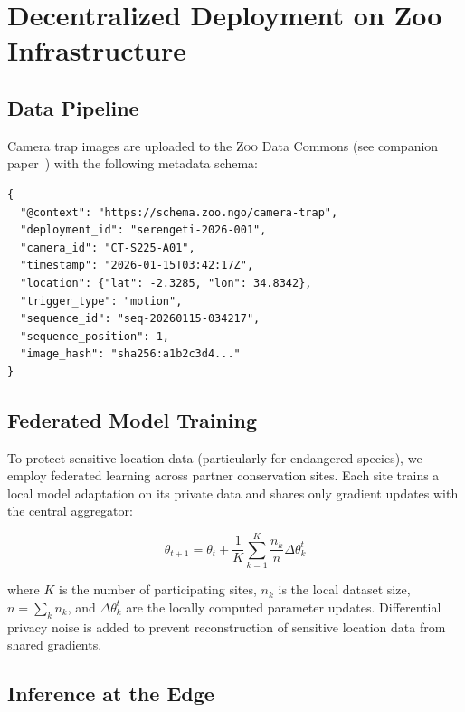 \documentclass[11pt,letterpaper]{article}
\newcommand{\Zoo}{\textsc{Zoo}}
\begin{document}
\section{Decentralized Deployment on Zoo Infrastructure}

\subsection{Data Pipeline}

Camera trap images are uploaded to the \Zoo{} Data Commons (see companion paper~\cite{zoo2026commons}) with the following metadata schema:

\begin{lstlisting}[basicstyle=\footnotesize\ttfamily, frame=single, caption={Camera trap metadata schema (JSON-LD).}]
{
  "@context": "https://schema.zoo.ngo/camera-trap",
  "deployment_id": "serengeti-2026-001",
  "camera_id": "CT-S225-A01",
  "timestamp": "2026-01-15T03:42:17Z",
  "location": {"lat": -2.3285, "lon": 34.8342},
  "trigger_type": "motion",
  "sequence_id": "seq-20260115-034217",
  "sequence_position": 1,
  "image_hash": "sha256:a1b2c3d4..."
}
\end{lstlisting}

\subsection{Federated Model Training}

To protect sensitive location data (particularly for endangered species), we employ federated learning across partner conservation sites. Each site trains a local model adaptation on its private data and shares only gradient updates with the central aggregator:

\begin{equation}
\theta_{t+1} = \theta_t + \frac{1}{K} \sum_{k=1}^{K} \frac{n_k}{n} \Delta \theta_k^t
\end{equation}

where $K$ is the number of participating sites, $n_k$ is the local dataset size, $n = \sum_k n_k$, and $\Delta \theta_k^t$ are the locally computed parameter updates. Differential privacy noise is added to prevent reconstruction of sensitive location data from shared gradients.

\subsection{Inference at the Edge}
\end{document}
